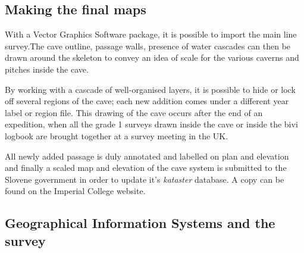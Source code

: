 \subsection{Making the final maps}
With a Vector Graphics Software package, it is possible to import the main line survey.The cave outline, passage walls, presence of water cascades can then be drawn around the skeleton to convey an idea of scale for the various caverns and pitches inside the cave.

By working with a cascade of well-organised layers, it is possible to hide or lock off several regions of the cave; each new addition comes under a different year label or region file. This drawing of the cave occurs after the end of an expedition, when all the grade 1 surveys drawn inside the cave or inside the bivi logbook are brought together at a survey meeting in the UK.

All newly added passage is duly annotated and labelled on plan and elevation and finally a scaled map and elevation of the cave system is submitted to the Slovene government in order to update it's \emph{kataster} database. A copy can be found on the Imperial College website.

\subsection{Geographical Information Systems and the survey}

